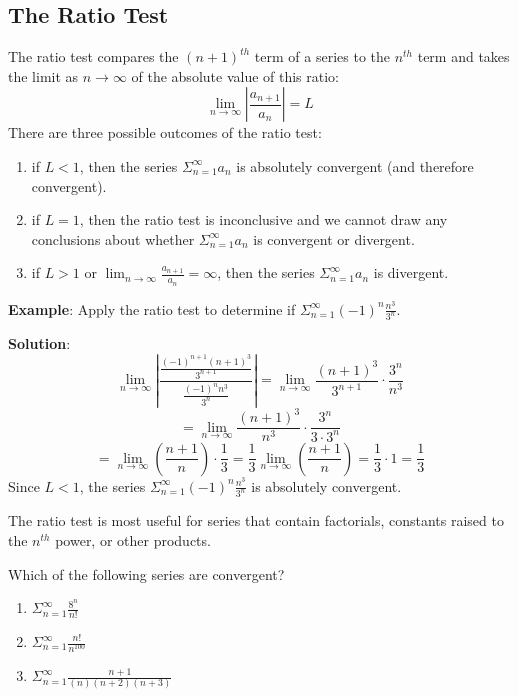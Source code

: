 \subsection{The Ratio Test}
The ratio test compares the $(n + 1)^{th}$ term of a series to the $n^{th}$ term 
and takes the limit as $n \to \infty$ of the absolute value of this ratio:
$$\lim_{n \to \infty} \left| \frac{a_{n + 1}}{a_n} \right| = L$$
There are three possible outcomes of the ratio test:
\begin{enumerate}
\item if $L < 1$, then the series $\Sigma_{n=1}^\infty a_n$ is absolutely 
convergent (and therefore convergent).
\item if $L = 1$, then the ratio test is inconclusive and we cannot draw any 
conclusions about whether $\Sigma_{n=1}^\infty a_n$ is convergent or divergent.
\item if $L > 1$ or $\lim_{n \to \infty} \frac{a_{n + 1}}{a_n} = \infty$, then 
the series $\Sigma_{n=1}^\infty a_n$ is divergent.
\end{enumerate}

\textbf{Example}: Apply the ratio test to determine if $\Sigma_{n=1}^\infty 
(-1)^n \frac{n^3}{3^n}$.

\textbf{Solution}: 
$$\lim_{n \to \infty} \left| \frac{\frac{(-1)^{n + 1}(n + 1)^3}{3^{n + 1}}}{
\frac{(-1)^n n^3}{3^n}} \right| = \lim_{n \to \infty} \frac{(n + 1)^3}{3^{n + 
1}} \cdot \frac{3^n}{n^3}$$
$$= \lim_{n \to \infty} \frac{(n + 1)^3}{n^3} \cdot \frac{3^n}{3 \cdot 3^n}$$
$$= \lim_{n \to \infty} \left( \frac{n + 1}{n} \right) \cdot \frac{1}{3} = 
\frac{1}{3} \lim_{n \to \infty} \left( \frac{n + 1}{n} \right) = \frac{1}{3} 
\cdot 1 = \frac{1}{3} $$
Since $L < 1$, the series $\Sigma_{n=1}^\infty (-1)^n \frac{n^3}{3^n}$ is absolutely convergent. 

The ratio test is most useful for series that contain factorials, constants raised to the $n^{th}$ power, or other products. 

\begin{Exercise} Which of the following series are convergent?
\begin{enumerate}
\item $\Sigma_{n=1}^\infty \frac{8^n}{n!}$
\item $\Sigma_{n=1}^\infty \frac{n!}{n^{100}}$
\item $\Sigma_{n=1}^\infty \frac{n + 1}{(n)(n+2)(n+3)}$
\end{enumerate}
\end{Exercise}

